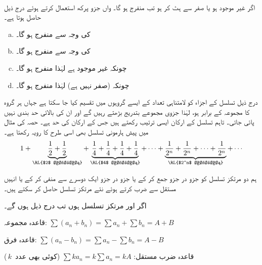 \\
اگر  غیر موجود ہو یا صفر سے ہٹ کر ہو تب  منفرج ہو گا۔
 واں جزو  پرکھ استعمال کرتے ہوئے درج ذیل حاصل ہوتا ہے۔
\begin{enumerate}[a.]
\item
{} کی وجہ سے  منفرج ہو گا۔
\item
{} کی وجہ سے  منفرج ہو گا۔
\item
چونکہ  غیر موجود ہے لہٰذا  منفرج ہو گا۔
\item
چونکہ (صفر نہیں ہے) لہٰذا  منفرج ہو گا۔
\end{enumerate}
 درج ذیل  تسلسل کے اجزاء کو لامتناہی  تعداد کے   ایسے گروہوں میں  تقسیم کیا جا سکتا ہے  جہاں ہر گروہ کا مجموعہ  کے برابر ہو، لہٰذا  جزوی مجموعے  بتدریج بڑھتے رہیں گے اور ان کی بالائی حد بندی نہیں پائی جاتی۔ تاہم تسلسل کے ارکان ایسی ترتیب  رکھتے ہیں  جس کے ارکان کی حد     ہے۔ حصہ   کی مثال   میں پیش ہارمونی تسلسل  بھی اسی  طرح  کا رویہ رکھتا ہے۔
\begin{align*}
1+\underbrace{\frac{1}{2}+\frac{1}{2}}_{\text{\RL{$2$ اجزاء}}}+\underbrace{\frac{1}{4}+\frac{1}{4}+\frac{1}{4}+\frac{1}{4}}_{\text{\RL{$4$ اجزاء}}}+\cdots+\underbrace{\frac{1}{2^n}+\frac{1}{2^n}+\cdots+\frac{1}{2^n}}_{\text{\RL{$2^n$ اجزاء}}}+\cdots
\end{align*}

ہم دو مرتکز  تسلسل کو جزو در جزو جمع کر کے یا  جزو در جزو ایک دوسرے سے منفی کر کے یا انہیں مستقل سے ضرب کرتے ہوئے نئے مرتکز  تسلسل حاصل کر سکتے ہیں۔

اگر  اور  مرتکز تسلسل ہوں تب درج ذیل ہوں گے۔
\begin{description}
\item{قاعدہ مجموعہ:}\quad 
$\sum (a_n+b_n)=\sum a_n+\sum b_n=A+B$
\item{قاعدہ فرق:}\quad
$\sum (a_n-b_n)=\sum a_n-\sum b_n=A-B$
\item{قاعدہ ضرب مستقل:}\quad
$\sum ka_n=k\sum a_n=kA$\quad
(کوئی بھی عدد $\,k\,$)
\end{description}


